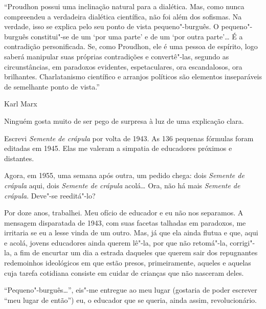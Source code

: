 \movetooddpage
\thispagestyle{empty}
\setcounter{footnote}{0}
\begin{vplace}[0.25]


{\large{}}
\end{vplace}

\pagebreak
\thispagestyle{empty}

\movetooddpage

\epigraph{``Proudhon possui uma inclinação natural para a dialética. Mas, como
nunca compreendeu a verdadeira dialética científica, não foi além dos
sofismas. Na verdade, isso se explica pelo seu ponto de vista
pequeno"-burguês. O pequeno"-burguês constitui"-se de um `por uma parte'
e de um `por outra parte'\ldots{} É a contradição personificada. Se, como
Proudhon, ele é uma pessoa de espírito, logo saberá manipular suas
próprias contradições e convertê"-las, segundo as circunstâncias, em
paradoxos evidentes, espetaculares, ora escandalosos, ora brilhantes.
Charlatanismo científico e arranjos políticos são elementos inseparáveis
de semelhante ponto de vista.''}{Karl Marx}

Ninguém gosta muito de ser pego de surpresa à luz de uma explicação
clara.

Escrevi \emph{Semente de crápula} por volta de 1943. As 136 pequenas
fórmulas foram editadas em 1945. Elas me valeram a simpatia de
educadores próximos e distantes.

Agora, em 1955, uma semana após outra, um pedido chega: dois
\emph{Semente de crápula} aqui, dois \emph{Semente de crápula}
acolá\ldots{} Ora, não há mais \emph{Semente de crápula}. Deve"-se
reeditá"-lo?

Por doze anos, trabalhei. Meu ofício de educador e eu não nos separamos.
A mensagem disparatada de 1943, com suas facetas talhadas em paradoxos,
me irritaria se eu a lesse vinda de um outro. Mas, já que ela ainda
flutua e que, aqui e acolá, jovens educadores ainda querem lê"-la, por
que não retomá"-la, corrigi"-la, a fim de encurtar um dia a estrada
daqueles que querem sair dos repugnantes redemoinhos ideológicos em que
estão presos, primeiramente, aqueles e aquelas cuja tarefa cotidiana
consiste em cuidar de crianças que não nasceram deles.

``Pequeno"-burguês\ldots{}'', eis"-me entregue ao meu lugar (gostaria de poder
escrever ``meu lugar de então'') eu, o educador que se queria, ainda
assim, revolucionário.

